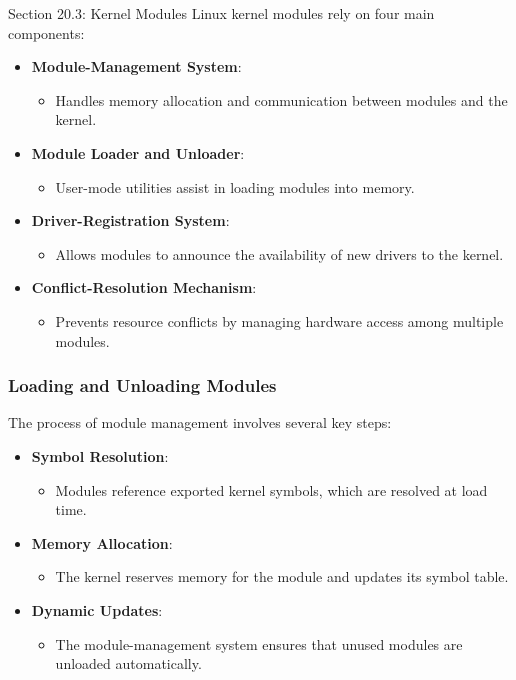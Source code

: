 \begin{notes}{Section 20.3: Kernel Modules}
    Linux kernel modules rely on four main components:
    \begin{itemize}
        \item \textbf{Module-Management System}:
        \begin{itemize}
            \item Handles memory allocation and communication between modules and the kernel.
        \end{itemize}
        \item \textbf{Module Loader and Unloader}:
        \begin{itemize}
            \item User-mode utilities assist in loading modules into memory.
        \end{itemize}
        \item \textbf{Driver-Registration System}:
        \begin{itemize}
            \item Allows modules to announce the availability of new drivers to the kernel.
        \end{itemize}
        \item \textbf{Conflict-Resolution Mechanism}:
        \begin{itemize}
            \item Prevents resource conflicts by managing hardware access among multiple modules.
        \end{itemize}
    \end{itemize}
    
    \subsubsection*{Loading and Unloading Modules}
    
    The process of module management involves several key steps:
    \begin{itemize}
        \item \textbf{Symbol Resolution}:
        \begin{itemize}
            \item Modules reference exported kernel symbols, which are resolved at load time.
        \end{itemize}
        \item \textbf{Memory Allocation}:
        \begin{itemize}
            \item The kernel reserves memory for the module and updates its symbol table.
        \end{itemize}
        \item \textbf{Dynamic Updates}:
        \begin{itemize}
            \item The module-management system ensures that unused modules are unloaded automatically.
        \end{itemize}
    \end{itemize}
    

\end{notes}
